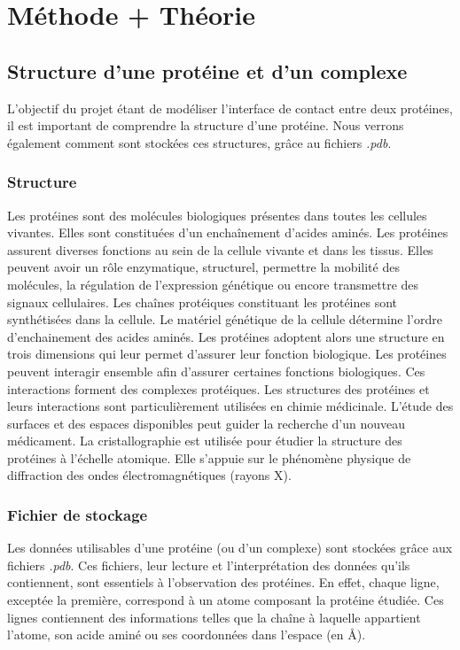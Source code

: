 \chapter{Méthode + Théorie}

\section{Structure d'une protéine et d'un complexe}

L'objectif du projet étant de modéliser l'interface de contact entre deux protéines,
il est important de comprendre la structure d'une protéine. Nous verrons également
comment sont stockées ces structures, grâce au fichiers \textit{.pdb}.

\subsection*{Structure}

Les protéines sont des molécules biologiques présentes dans toutes les cellules vivantes.
Elles sont constituées d'un enchaînement d'acides aminés.
Les protéines assurent diverses fonctions au sein de la cellule vivante et dans les tissus.
Elles peuvent avoir un rôle enzymatique, structurel, permettre la mobilité des molécules, la
régulation de l'expression génétique ou encore transmettre des signaux cellulaires.
Les chaînes protéiques constituant les protéines sont synthétisées dans la cellule. Le
matériel génétique de la cellule détermine l'ordre d'enchainement des acides aminés.
Les protéines adoptent alors une structure en trois dimensions qui leur permet d'assurer
 leur fonction biologique. Les protéines peuvent interagir ensemble afin d'assurer certaines
fonctions biologiques. Ces interactions forment des complexes protéiques. Les structures
 des protéines et leurs interactions sont particulièrement utilisées en chimie médicinale.
L'étude des surfaces et des espaces disponibles peut guider la recherche d'un nouveau
médicament. La cristallographie est utilisée pour étudier la structure des protéines à
l'échelle atomique. Elle s'appuie sur le phénomène physique de diffraction des ondes
électromagnétiques (rayons X).

\subsection*{Fichier de stockage}

Les données utilisables d'une protéine (ou d'un complexe) sont stockées grâce aux
fichiers \textit{.pdb}. Ces fichiers, leur lecture et l'interprétation des données
qu'ils contiennent, sont essentiels à l'observation des protéines. En effet, chaque
ligne, exceptée la première, correspond à un atome composant la protéine étudiée.
Ces lignes contiennent des informations telles que la chaîne à laquelle appartient
l'atome, son acide aminé ou ses coordonnées dans l'espace (en $\si{\angstrom}$).

